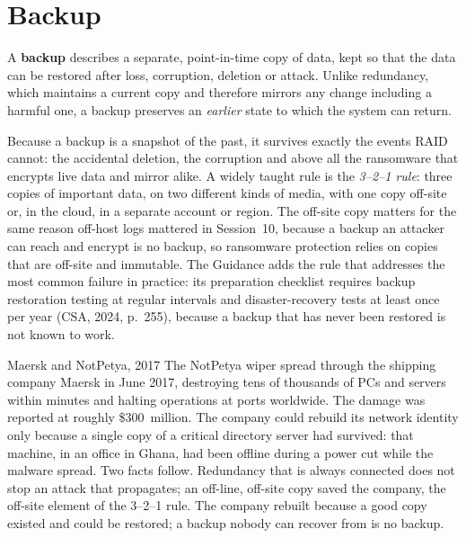 \section{Backup}

\begin{definition}[Backup]\label{def:backup}
A \textbf{backup} describes a separate, point-in-time copy of data, kept so
that the data can be restored after loss, corruption, deletion or attack.
Unlike redundancy, which maintains a current copy and therefore mirrors any
change including a harmful one, a backup preserves an \emph{earlier} state to
which the system can return.
\end{definition}

Because a backup is a snapshot of the past, it survives exactly the events
RAID cannot: the accidental deletion, the corruption and above all the
ransomware that encrypts live data and mirror alike. A widely taught rule is
the \emph{3--2--1 rule}: three copies of important data, on two different
kinds of media, with one copy off-site or, in the cloud, in a separate
account or region. The off-site copy matters for the same reason off-host
logs mattered in Session~10, because a backup an attacker can reach and
encrypt is no backup, so ransomware protection relies on copies that are
off-site and immutable. The Guidance adds the rule that addresses the most
common failure in practice: its preparation checklist requires backup
restoration testing at regular intervals and disaster-recovery tests at
least once per year (CSA, 2024, p.~255), because a backup that has never
been restored is not known to work.

\begin{realworld}{Maersk and NotPetya, 2017}
The NotPetya wiper spread through the shipping company Maersk in June 2017,
destroying tens of thousands of PCs and servers within minutes and halting
operations at ports worldwide. The damage was reported at roughly
\$300~million. The company could rebuild its network identity only because a single copy
of a critical directory server had survived: that machine, in an office in
Ghana, had been offline during a power cut while the malware spread. Two
facts follow. Redundancy that is always connected does not stop an attack
that propagates; an off-line, off-site copy saved the company, the off-site
element of the 3--2--1 rule. The company rebuilt because a good copy existed
and could be restored; a backup nobody can recover from is no backup.
\end{realworld}

